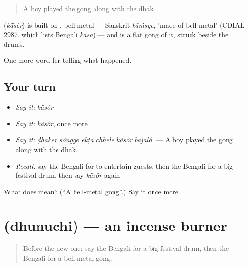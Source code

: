 \begin{quote}
A boy played the gong along with the dhak.
\end{quote}

\begin{cousinweb}
\textbf{} (\emph{kā̃sôr}) is built on , bell-metal — Sanskrit \emph{kāṁsya}, 'made of bell-metal' (CDIAL 2987, which lists Bengali \emph{kā̃sā}) — and is a flat gong of it, struck beside the drums.
\end{cousinweb}

\begin{grammarlens}[title={What you've built}]
One more word for telling what happened.
\end{grammarlens}

\subsection*{Your turn}
\begin{itemize}
\raggedright
  \item \emph{Say it:} \emph{kā̃sôr}
  \item \emph{Say it:} \emph{kā̃sôr}, once more
  \item \emph{Say it:} \emph{ḍhāker sôngge ekṭā chhele kā̃sôr bājālô.} — A boy played the gong along with the dhak.
  \item \emph{Recall:} say the Bengali for to entertain guests, then the Bengali for a big festival drum, then say \emph{kā̃sôr} again
\end{itemize}

\begin{tcolorbox}[breakable,colback=teal!4,colframe=teal!35!black,title={Before you move on}]
What does  mean? (\textquotedblleft{}A bell-metal gong\textquotedblright{}.) Say it once more.
\end{tcolorbox}
\section[\texorpdfstring{\bn{ধুনুচি} (dhunuchi)}{ধুনুচি (dhunuchi)}]{ (dhunuchi) — an incense burner}

\label{lesson:BN-C307-dhunuchi}



\begin{quote}
Before the new one: say the Bengali for a big festival drum, then the Bengali for a bell-metal gong.
\end{quote}

